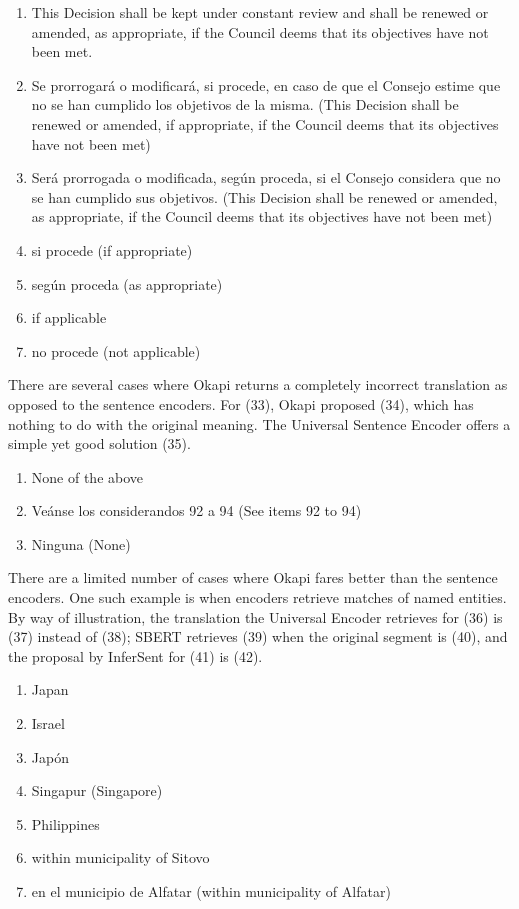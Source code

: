 \begin{enumerate}[resume,label={(\arabic*)}]
	\item	This Decision shall be kept under constant review and shall be renewed or amended, as appropriate, if the Council deems that its objectives have not been met.
	\item	Se prorrogará o modificará, si procede, en caso de que el Consejo estime que no se han cumplido los objetivos de la misma. (This Decision shall be renewed or amended, if appropriate, if the Council deems that its objectives have not been met)
	\item	Será prorrogada o modificada, según proceda, si el Consejo considera que no se han cumplido sus objetivos. (This Decision shall be renewed or amended, as appropriate, if the Council deems that its objectives have not been met)
	\item	si procede (if appropriate)
	\item	según proceda (as appropriate)
	\item	if applicable
	\item	no procede (not applicable)
\end{enumerate}

There are several cases where Okapi returns a completely incorrect translation as opposed to the sentence encoders. For (33), Okapi proposed (34), which has nothing to do with the original meaning. The Universal Sentence Encoder offers a simple yet good solution (35). 

\begin{enumerate}[resume,label={(\arabic*)}]
	\item	None of the above
	\item	Veánse los considerandos 92 a 94 (See items 92 to 94)
	\item	Ninguna (None)
	
\end{enumerate}

There are a limited number of cases where Okapi fares better than the sentence encoders. One such example is when encoders retrieve matches of named entities. By way of illustration, the translation the Universal Encoder retrieves for (36) is (37) instead of (38); SBERT retrieves (39) when the original segment is (40), and the proposal by InferSent for (41) is (42). 

\begin{enumerate}[resume,label={(\arabic*)}]
	\item	Japan
	\item	Israel
	\item	Japón
	\item	Singapur (Singapore)
	\item	Philippines
	\item	within municipality of Sitovo
	\item	en el municipio de Alfatar (within municipality of Alfatar)
\end{enumerate}

